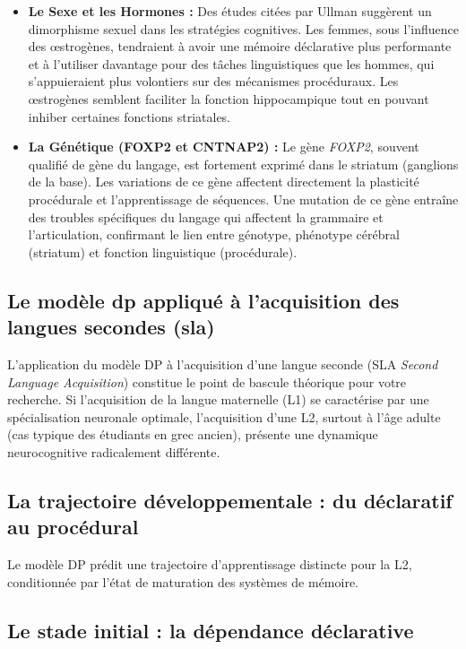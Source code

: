 \begin{itemize}\item \textbf{Le Sexe et les Hormones :} Des études citées par Ullman suggèrent un dimorphisme sexuel dans les stratégies cognitives. Les femmes, sous l'influence des œstrogènes, tendraient à avoir une mémoire déclarative plus performante et à l'utiliser davantage pour des tâches linguistiques que les hommes, qui s'appuieraient plus volontiers sur des mécanismes procéduraux. Les œstrogènes semblent faciliter la fonction hippocampique tout en pouvant inhiber certaines fonctions striatales.\item \textbf{La Génétique (FOXP2 et CNTNAP2) :} Le gène \textit{FOXP2}, souvent qualifié de \og gène du langage\fg{}, est fortement exprimé dans le striatum (ganglions de la base). Les variations de ce gène affectent directement la plasticité procédurale et l'apprentissage de séquences. Une mutation de ce gène entraîne des troubles spécifiques du langage qui affectent la grammaire et l'articulation, confirmant le lien entre génotype, phénotype cérébral (striatum) et fonction linguistique (procédurale).\end{itemize}

\subsection{Le modèle dp appliqué à l'acquisition des langues secondes (sla)}

L'application du modèle DP à l'acquisition d'une langue seconde (SLA \- \textit{Second Language
Acquisition}) constitue le point de bascule théorique pour votre recherche. Si l'acquisition de la
langue maternelle (L1) se caractérise par une spécialisation neuronale optimale, l'acquisition d'une
L2, surtout à l'âge adulte (cas typique des étudiants en grec ancien), présente une dynamique
neurocognitive radicalement différente.



\subsection{La trajectoire développementale : du déclaratif au procédural}

Le modèle DP prédit une trajectoire d'apprentissage distincte pour la L2, conditionnée par l'état de
maturation des systèmes de mémoire.



\subsection{Le stade initial : la dépendance déclarative}

